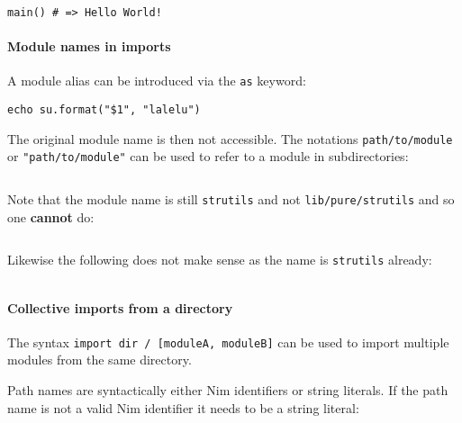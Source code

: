 \begin{verbatim}
\end{verbatim}

\begin{verbatim}
main() # => Hello World!
\end{verbatim}

\hypertarget{module-names-in-imports}{%
\paragraph{Module names in imports}\label{module-names-in-imports}}

A module alias can be introduced via the \texttt{as} keyword:

\begin{verbatim}
echo su.format("$1", "lalelu")
\end{verbatim}

The original module name is then not accessible. The notations
\texttt{path/to/module} or \texttt{"path/to/module"} can be used to
refer to a module in subdirectories:

\begin{verbatim}
\end{verbatim}

Note that the module name is still \texttt{strutils} and not
\texttt{lib/pure/strutils} and so one \textbf{cannot} do:

\begin{verbatim}
\end{verbatim}

Likewise the following does not make sense as the name is
\texttt{strutils} already:

\begin{verbatim}
\end{verbatim}

\hypertarget{collective-imports-from-a-directory}{%
\paragraph{Collective imports from a
directory}\label{collective-imports-from-a-directory}}

The syntax \texttt{import\ dir\ /\ {[}moduleA,\ moduleB{]}} can be used
to import multiple modules from the same directory.

Path names are syntactically either Nim identifiers or string literals.
If the path name is not a valid Nim identifier it needs to be a string
literal:

\begin{verbatim}
\end{verbatim}

